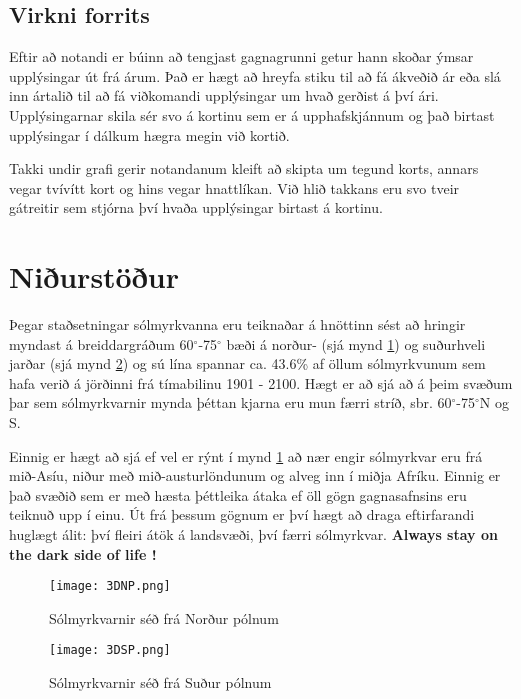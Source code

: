 \documentclass[12pt, git, final]{rureport}
\begin{document}
\subsection{Virkni forrits}\label{virkni}
Eftir að notandi er búinn að tengjast gagnagrunni getur hann skoðar ýmsar upplýsingar út frá árum. Það er hægt að hreyfa stiku til að fá ákveðið ár eða slá inn ártalið til að fá viðkomandi upplýsingar um hvað gerðist á því ári. Upplýsingarnar skila sér svo á kortinu sem er á upphafskjánnum og það birtast upplýsingar í dálkum hægra megin við kortið. 

Takki undir grafi gerir notandanum kleift að skipta um tegund korts, annars vegar tvívítt kort og hins vegar hnattlíkan. Við hlið takkans eru svo tveir gátreitir sem stjórna því hvaða upplýsingar birtast á kortinu.


\section{Niðurstöður}\label{nidurstodur}

Þegar staðsetningar sólmyrkvanna eru teiknaðar á hnöttinn sést að hringir myndast á breiddargráðum 60$^{\circ}$-75$^{\circ}$ bæði á norður- (sjá mynd \ref{fig:3DNP}) og suðurhveli jarðar (sjá mynd \ref{fig:3DSP}) og sú lína spannar ca. 43.6\% af öllum sólmyrkvunum sem hafa verið á jörðinni frá tímabilinu 1901 - 2100. Hægt er að sjá að á þeim svæðum þar sem sólmyrkvarnir mynda þéttan kjarna eru mun færri stríð, sbr. 60$^{\circ}$-75$^{\circ}$N og S.

Einnig er hægt að sjá ef vel er rýnt í mynd \ref{fig:3DNP} að nær engir sólmyrkvar eru frá mið-Asíu, niður með mið-austurlöndunum og alveg inn í miðja Afríku. Einnig er það svæðið sem er með hæsta þéttleika átaka ef öll gögn gagnasafnsins eru teiknuð upp í einu. Út frá þessum gögnum er því hægt að draga eftirfarandi huglægt álit: því fleiri átök á landsvæði, því færri sólmyrkvar. \textbf{Always stay on the dark side of life !}
\pagebreak

\begin{figure}
	\centering
	\texttt{[image: 3DNP.png]}
	\caption{Sólmyrkvarnir séð frá Norður pólnum}
	\label{fig:3DNP}
\end{figure}

\begin{figure}
	\centering
	\texttt{[image: 3DSP.png]}
	\caption{Sólmyrkvarnir séð frá Suður pólnum}
	\label{fig:3DSP}
\end{figure}
\end{document}

